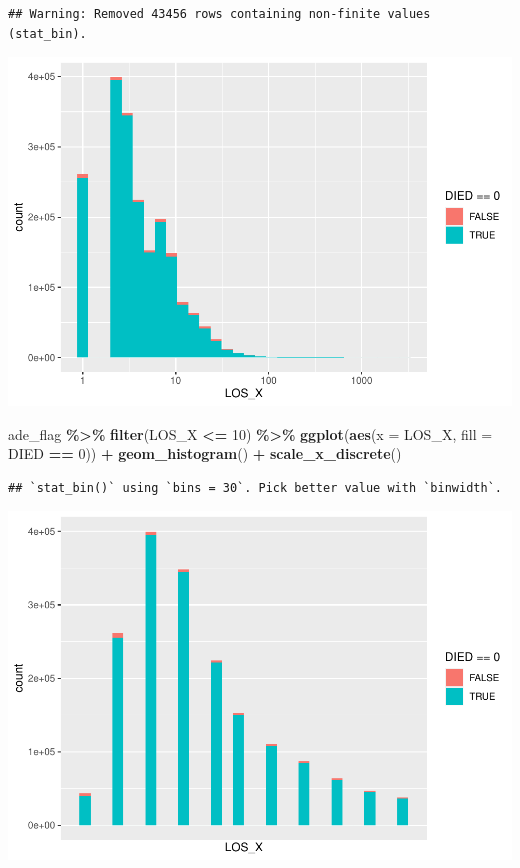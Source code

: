 \documentclass[preprint, 3p,
authoryear]{elsarticle} %
\newenvironment{Shaded}{\begin{snugshade}}{\end{snugshade}}
\newcommand{\DataTypeTok}[1]{\textcolor[rgb]{0.13,0.29,0.53}{#1}}
\newcommand{\DecValTok}[1]{\textcolor[rgb]{0.00,0.00,0.81}{#1}}
\newcommand{\KeywordTok}[1]{\textcolor[rgb]{0.13,0.29,0.53}{\textbf{#1}}}
\newcommand{\NormalTok}[1]{#1}
\newcommand{\OperatorTok}[1]{\textcolor[rgb]{0.81,0.36,0.00}{\textbf{#1}}}
\newcommand{\StringTok}[1]{\textcolor[rgb]{0.31,0.60,0.02}{#1}}
\begin{document}
\begin{verbatim}
## Warning: Removed 43456 rows containing non-finite values (stat_bin).
\end{verbatim}

\includegraphics{final-project-paper_files/figure-latex/los-2.pdf}

\begin{Shaded}
\begin{Highlighting}[]
\NormalTok{ade\_flag }\OperatorTok{\%\textgreater{}\%}
\StringTok{  }\KeywordTok{filter}\NormalTok{(LOS\_X }\OperatorTok{\textless{}=}\StringTok{ }\DecValTok{10}\NormalTok{) }\OperatorTok{\%\textgreater{}\%}
\StringTok{  }\KeywordTok{ggplot}\NormalTok{(}\KeywordTok{aes}\NormalTok{(}\DataTypeTok{x =}\NormalTok{ LOS\_X, }\DataTypeTok{fill =}\NormalTok{ DIED }\OperatorTok{==}\StringTok{ }\DecValTok{0}\NormalTok{)) }\OperatorTok{+}
\StringTok{  }\KeywordTok{geom\_histogram}\NormalTok{() }\OperatorTok{+}
\StringTok{  }\KeywordTok{scale\_x\_discrete}\NormalTok{()}
\end{Highlighting}
\end{Shaded}

\begin{verbatim}
## `stat_bin()` using `bins = 30`. Pick better value with `binwidth`.
\end{verbatim}

\includegraphics{final-project-paper_files/figure-latex/los-3.pdf}
\end{document}
